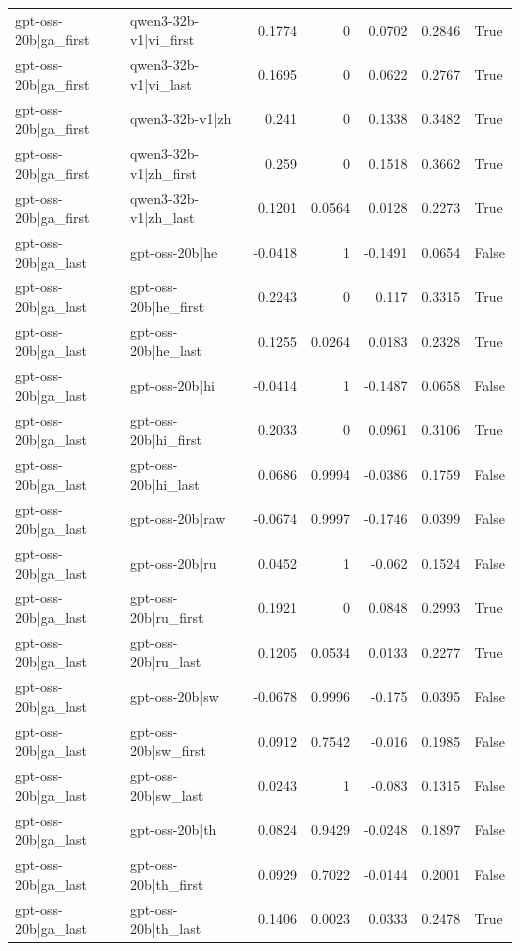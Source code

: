 \begin{table}
\begin{tabular}{l l r r r r l}
gpt-oss-20b|ga_first & qwen3-32b-v1|vi_first & 0.1774 & 0 & 0.0702 & 0.2846 & True \\
gpt-oss-20b|ga_first & qwen3-32b-v1|vi_last & 0.1695 & 0 & 0.0622 & 0.2767 & True \\
gpt-oss-20b|ga_first & qwen3-32b-v1|zh & 0.241 & 0 & 0.1338 & 0.3482 & True \\
gpt-oss-20b|ga_first & qwen3-32b-v1|zh_first & 0.259 & 0 & 0.1518 & 0.3662 & True \\
gpt-oss-20b|ga_first & qwen3-32b-v1|zh_last & 0.1201 & 0.0564 & 0.0128 & 0.2273 & True \\
gpt-oss-20b|ga_last & gpt-oss-20b|he & -0.0418 & 1 & -0.1491 & 0.0654 & False \\
gpt-oss-20b|ga_last & gpt-oss-20b|he_first & 0.2243 & 0 & 0.117 & 0.3315 & True \\
gpt-oss-20b|ga_last & gpt-oss-20b|he_last & 0.1255 & 0.0264 & 0.0183 & 0.2328 & True \\
gpt-oss-20b|ga_last & gpt-oss-20b|hi & -0.0414 & 1 & -0.1487 & 0.0658 & False \\
gpt-oss-20b|ga_last & gpt-oss-20b|hi_first & 0.2033 & 0 & 0.0961 & 0.3106 & True \\
gpt-oss-20b|ga_last & gpt-oss-20b|hi_last & 0.0686 & 0.9994 & -0.0386 & 0.1759 & False \\
gpt-oss-20b|ga_last & gpt-oss-20b|raw & -0.0674 & 0.9997 & -0.1746 & 0.0399 & False \\
gpt-oss-20b|ga_last & gpt-oss-20b|ru & 0.0452 & 1 & -0.062 & 0.1524 & False \\
gpt-oss-20b|ga_last & gpt-oss-20b|ru_first & 0.1921 & 0 & 0.0848 & 0.2993 & True \\
gpt-oss-20b|ga_last & gpt-oss-20b|ru_last & 0.1205 & 0.0534 & 0.0133 & 0.2277 & True \\
gpt-oss-20b|ga_last & gpt-oss-20b|sw & -0.0678 & 0.9996 & -0.175 & 0.0395 & False \\
gpt-oss-20b|ga_last & gpt-oss-20b|sw_first & 0.0912 & 0.7542 & -0.016 & 0.1985 & False \\
gpt-oss-20b|ga_last & gpt-oss-20b|sw_last & 0.0243 & 1 & -0.083 & 0.1315 & False \\
gpt-oss-20b|ga_last & gpt-oss-20b|th & 0.0824 & 0.9429 & -0.0248 & 0.1897 & False \\
gpt-oss-20b|ga_last & gpt-oss-20b|th_first & 0.0929 & 0.7022 & -0.0144 & 0.2001 & False \\
gpt-oss-20b|ga_last & gpt-oss-20b|th_last & 0.1406 & 0.0023 & 0.0333 & 0.2478 & True \\

\end{tabular}
\end{table}
